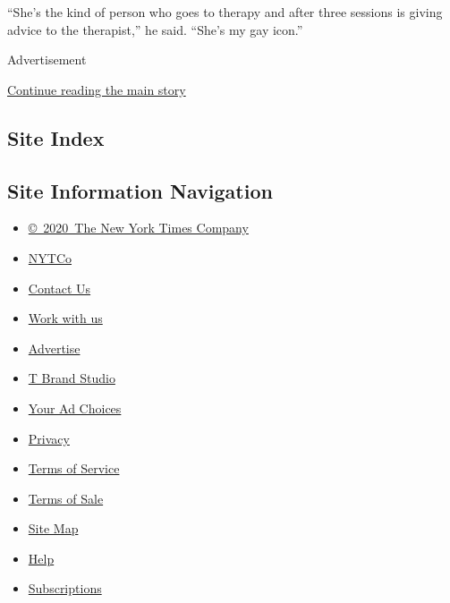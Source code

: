 ``She's the kind of person who goes to therapy and after three sessions
is giving advice to the therapist,'' he said. ``She's my gay icon.''

Advertisement

\protect\hyperlink{after-bottom}{Continue reading the main story}

\hypertarget{site-index}{%
\subsection{Site Index}\label{site-index}}

\hypertarget{site-information-navigation}{%
\subsection{Site Information
Navigation}\label{site-information-navigation}}

\begin{itemize}
\tightlist
\item
  \href{https://help.nytimes.com/hc/en-us/articles/115014792127-Copyright-notice}{©~2020~The
  New York Times Company}
\end{itemize}

\begin{itemize}
\tightlist
\item
  \href{https://www.nytco.com/}{NYTCo}
\item
  \href{https://help.nytimes.com/hc/en-us/articles/115015385887-Contact-Us}{Contact
  Us}
\item
  \href{https://www.nytco.com/careers/}{Work with us}
\item
  \href{https://nytmediakit.com/}{Advertise}
\item
  \href{http://www.tbrandstudio.com/}{T Brand Studio}
\item
  \href{https://www.nytimes.com/privacy/cookie-policy\#how-do-i-manage-trackers}{Your
  Ad Choices}
\item
  \href{https://www.nytimes.com/privacy}{Privacy}
\item
  \href{https://help.nytimes.com/hc/en-us/articles/115014893428-Terms-of-service}{Terms
  of Service}
\item
  \href{https://help.nytimes.com/hc/en-us/articles/115014893968-Terms-of-sale}{Terms
  of Sale}
\item
  \href{https://spiderbites.nytimes.com}{Site Map}
\item
  \href{https://help.nytimes.com/hc/en-us}{Help}
\item
  \href{https://www.nytimes.com/subscription?campaignId=37WXW}{Subscriptions}
\end{itemize}

